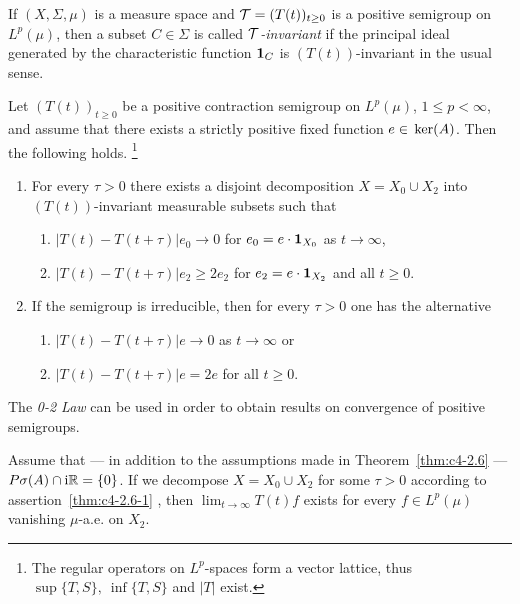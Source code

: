 If\/ $(X, \Sigma, \mu)$ is a measure space and $\TT = (T(t))_{t \geq 0}$ is a positive semigroup on $L^{p}(\mu)$, then a subset $C \in \Sigma$ is called \emph{$\mathcal{T}$-invariant} if the principal ideal generated by the characteristic function $\mathbf{1}_{C}$ is $(T(t))$-invariant in the usual sense.
\begin{theorem}\label{thm:c4-2.6}
%
%
Let $(T(t))_{t \geq 0}$ be a positive contraction semigroup on $L^{p}(\mu)$, $1 \leq p < \infty$, and assume that there exists a strictly positive fixed function $e \in \mathop{}\mathrm{ker}(A)$. 
Then the following holds. 
\footnote{The regular operators on $L^p$-spaces form a vector lattice, thus $\sup\{T,S\},\ \inf\{T,S\}$ and $|T|$ exist.}
\begin{enumerate}[\upshape (i)]
\item \label{thm:c4-2.6-1}
For every $\tau > 0$ there exists a disjoint decomposition $X = X_{0} \cup X_{2}$ into $(T(t))$-invariant measurable subsets such that
\begin{enumerate}
    \item[(0)] \label{thm:c4-2.6-1.1} 
    $|T(t) - T(t+\tau)|e_{0} \to 0$ for $e_{0} = e \cdot \mathbf{1}_{X_{0}}$ as $t \to \infty$,
    \item[(2)] \label{thm:c4-2.6-1.2} 
    $|T(t) - T(t+\tau)|e_{2} \geq 2e_{2}$ for $e_{2} = e \cdot \mathbf{1}_{X_{2}}$ and all $t \geq 0$.
    \end{enumerate}

\item \label{thm:c4-2.6-2} 
If the semigroup is irreducible, then for every $\tau > 0$ one has the alternative
\begin{enumerate}
    \item[(0)] \label{thm:c4-2.6-2.1} 
    $|T(t) - T(t+\tau)|e \to 0$ as $t \to \infty$ or
    \item[(2)] \label{thm:c4-2.6-2.2} 
    $|T(t) - T(t+\tau)|e = 2e$ for all $t \geq 0$.
\end{enumerate}
\end{enumerate}
\end{theorem}
The \emph{0-2 Law} can be used in order to obtain results on convergence of positive semigroups.
\begin{corollary}\label{cor:c4-2.7}
%
Assume that --- in addition to the assumptions made in Theorem~\ref{thm:c4-2.6} --- $P{\sigma}(A) \cap \mathrm{i}\mathbb{R} = \{0\}$.
If we decompose $X = X_{0} \cup X_{2}$ for some $\tau > 0$ according to assertion~\ref{thm:c4-2.6-1} , then $\lim_{t \to \infty} T(t)f$ exists for every $f \in L^{p}(\mu)$ vanishing $\mu$-a.e. on $X_{2}$.
\end{corollary}
